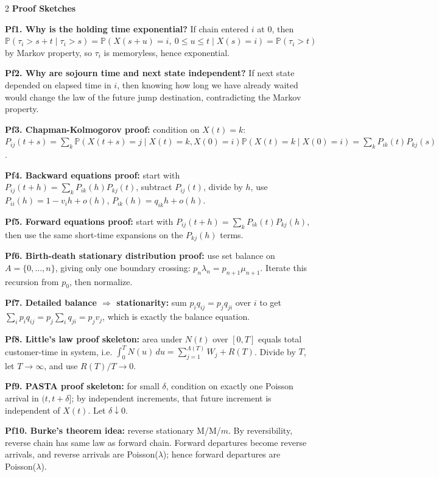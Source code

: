 \documentclass[10pt,fleqn]{article}
\newcommand{\PP}{\mathbb{P}}
\newcommand{\shead}[1]{\vspace{0.05ex}\textbf{\scriptsize #1}\par}
\newcommand{\pfq}[2]{\textbf{#1} #2\par}
\begin{document}
\begin{multicols*}{2}
\shead{Proof Sketches}
\pfq{Pf1. Why is the holding time exponential?}{If chain entered \(i\) at \(0\), then \(\PP(\tau_i>s+t\mid \tau_i>s)=\PP(X(s+u)=i,\ 0\le u\le t\mid X(s)=i)=\PP(\tau_i>t)\) by Markov property, so \(\tau_i\) is memoryless, hence exponential.}
\pfq{Pf2. Why are sojourn time and next state independent?}{If next state depended on elapsed time in \(i\), then knowing how long we have already waited would change the law of the future jump destination, contradicting the Markov property.}
\pfq{Pf3. Chapman-Kolmogorov proof:}{condition on \(X(t)=k\): \(P_{ij}(t+s)=\sum_k\PP(X(t+s)=j\mid X(t)=k,X(0)=i)\PP(X(t)=k\mid X(0)=i)=\sum_kP_{ik}(t)P_{kj}(s)\).}
\pfq{Pf4. Backward equations proof:}{start with \(P_{ij}(t+h)=\sum_kP_{ik}(h)P_{kj}(t)\), subtract \(P_{ij}(t)\), divide by \(h\), use \(P_{ii}(h)=1-v_ih+o(h)\), \(P_{ik}(h)=q_{ik}h+o(h)\).}
\pfq{Pf5. Forward equations proof:}{start with \(P_{ij}(t+h)=\sum_kP_{ik}(t)P_{kj}(h)\), then use the same short-time expansions on the \(P_{kj}(h)\) terms.}
\pfq{Pf6. Birth-death stationary distribution proof:}{use set balance on \(A=\{0,\dots,n\}\), giving only one boundary crossing: \(p_n\lambda_n=p_{n+1}\mu_{n+1}\). Iterate this recursion from \(p_0\), then normalize.}
\pfq{Pf7. Detailed balance \(\Rightarrow\) stationarity:}{sum \(p_iq_{ij}=p_jq_{ji}\) over \(i\) to get \(\sum_i p_iq_{ij}=p_j\sum_i q_{ji}=p_jv_j\), which is exactly the balance equation.}
\pfq{Pf8. Little's law proof skeleton:}{area under \(N(t)\) over \([0,T]\) equals total customer-time in system, i.e. \(\int_0^TN(u)\,du=\sum_{j=1}^{\Lambda(T)}W_j+R(T)\). Divide by \(T\), let \(T\to\infty\), and use \(R(T)/T\to0\).}
\pfq{Pf9. PASTA proof skeleton:}{for small \(\delta\), condition on exactly one Poisson arrival in \((t,t+\delta]\); by independent increments, that future increment is independent of \(X(t)\). Let \(\delta\downarrow0\).}
\pfq{Pf10. Burke's theorem idea:}{reverse stationary M/M/\(m\). By reversibility, reverse chain has same law as forward chain. Forward departures become reverse arrivals, and reverse arrivals are Poisson(\(\lambda\)); hence forward departures are Poisson(\(\lambda\)).}

\end{multicols*}
\end{document}
